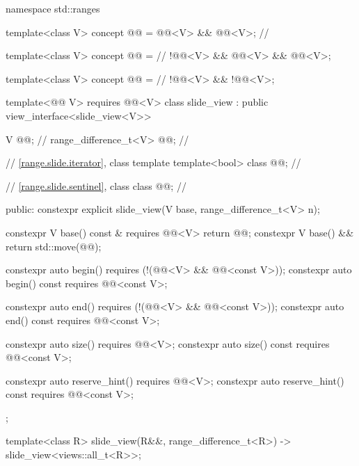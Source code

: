 \begin{codeblock}
namespace std::ranges {
  template<class V>
  concept @@ = @@<V> && @@<V>;       // \expos

  template<class V>
  concept @@ =                                            // \expos
    !@@<V> && @@<V> && @@<V>;

  template<class V>
  concept @@ =                                           // \expos
    !@@<V> && !@@<V>;

  template<@@ V>
    requires @@<V>
  class slide_view : public view_interface<slide_view<V>> {
    V @@;                            // \expos
    range_difference_t<V> @@;           // \expos

    // \ref{range.slide.iterator}, class template 
    template<bool> class @@;      // \expos

    // \ref{range.slide.sentinel}, class 
    class @@;                     // \expos

  public:
    constexpr explicit slide_view(V base, range_difference_t<V> n);

    constexpr V base() const & requires @@<V> { return @@; }
    constexpr V base() && { return std::move(@@); }

    constexpr auto begin()
      requires (!(@@<V> && @@<const V>));
    constexpr auto begin() const requires @@<const V>;

    constexpr auto end()
      requires (!(@@<V> && @@<const V>));
    constexpr auto end() const requires @@<const V>;

    constexpr auto size() requires @@<V>;
    constexpr auto size() const requires @@<const V>;

    constexpr auto reserve_hint() requires @@<V>;
    constexpr auto reserve_hint() const requires @@<const V>;
  };

  template<class R>
    slide_view(R&&, range_difference_t<R>) -> slide_view<views::all_t<R>>;
}
\end{codeblock}

